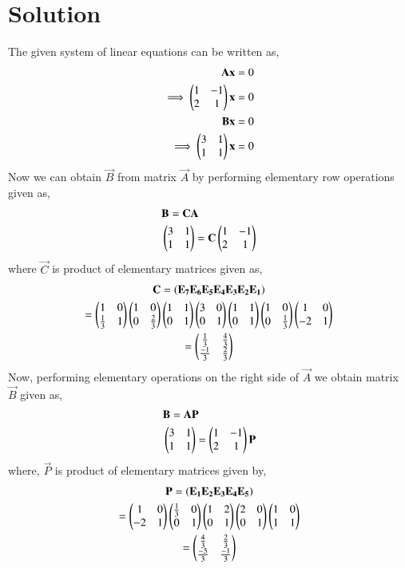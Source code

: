 \documentclass[journal,12pt,twocolumn]{IEEEtran}
\begin{document}
\section{Solution}
The given system of linear equations can be written as,   
\begin{align}
    \mathbf{A}\mathbf{x} &= 0 \\
    \implies\begin{pmatrix}1&-1\\2&1\end{pmatrix}\mathbf{x} &= 0 \label{ax=0}\\
    \mathbf{B}\mathbf{x} &= 0 \\
    \implies\begin{pmatrix}3&1\\1&1\end{pmatrix}\mathbf{x} &= 0 \label{bx=0}
\end{align}
Now we can obtain $\vec{B}$ from matrix $\vec{A}$ by performing elementary row operations given as, 
\begin{align}
    &\mathbf{B} = \mathbf{C}\mathbf{A} \label{b=ca}\\
    &\begin{pmatrix}3&1\\1&1\end{pmatrix} = \mathbf{C}\begin{pmatrix}1&-1\\2&1\end{pmatrix} \label{eq:ca}
\end{align}
where $\vec{C}$ is product of elementary matrices given as, 
\begin{multline}
    \mathbf{C} = \left(\mathbf{E_7}\mathbf{E_6}\mathbf{E_5}\mathbf{E_4}\mathbf{E_3}\mathbf{E_2}\mathbf{E_1}\right)\\
    =\begin{pmatrix}1&0\\\frac{1}{3}&1\end{pmatrix}\begin{pmatrix}1&0\\0&\frac{2}{3}\end{pmatrix}\begin{pmatrix}1&1\\0&1\end{pmatrix}\begin{pmatrix}3&0\\0&1\end{pmatrix} \begin{pmatrix}1&1\\0&1\end{pmatrix}\begin{pmatrix}1&0\\0&\frac{1}{3}\end{pmatrix}\begin{pmatrix}1&0\\-2&1\end{pmatrix}\\
    =\begin{pmatrix}\frac{1}{3}&\frac{4}{3} \\ \frac{-1}{3}&\frac{2}{3}\end{pmatrix}
\end{multline}
Now, performing elementary operations on the right side of $\vec{A}$ we obtain matrix $\vec{B}$ given as, 
\begin{align}
    &\mathbf{B} = \mathbf{A}\mathbf{P} \label{b=ap}\\
    &\begin{pmatrix}3&1\\1&1\end{pmatrix} = \begin{pmatrix}1&-1\\2&1\end{pmatrix}\mathbf{P}
\end{align}
where, $\vec{P}$ is product of elementary matrices given by, 
\begin{multline}
    \mathbf{P} = \left(\mathbf{E_1}\mathbf{E_2}\mathbf{E_3}\mathbf{E_4}\mathbf{E_5}\right)\\
    =\begin{pmatrix}1&0\\-2&1\end{pmatrix}\begin{pmatrix}\frac{1}{3}&0\\0&1\end{pmatrix}\begin{pmatrix}1&2\\0&1\end{pmatrix}\begin{pmatrix}2&0\\0&1\end{pmatrix}\begin{pmatrix}1&0\\1&1\end{pmatrix} \\
    = \begin{pmatrix}\frac{4}{3}&\frac{2}{3}\\ \frac{-5}{3}&\frac{-1}{3}\end{pmatrix}
\end{multline}
\end{document}
